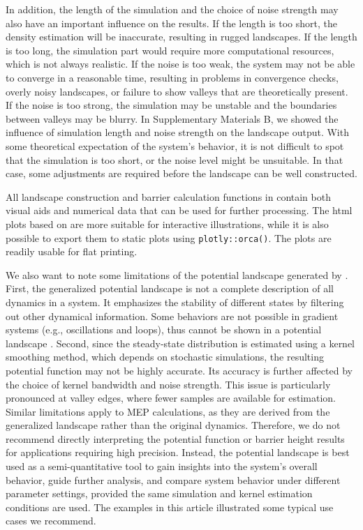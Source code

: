In addition, the length of the simulation and the choice of noise strength may also have an important influence on the results. If the length is too short, the density estimation will be inaccurate, resulting in rugged landscapes. If the length is too long, the simulation part would require more computational resources, which is not always realistic. If the noise is too weak, the system may not be able to converge in a reasonable time, resulting in problems in convergence checks, overly noisy landscapes, or failure to show valleys that are theoretically present. If the noise is too strong, the simulation may be unstable and the boundaries between valleys may be blurry. In Supplementary Materials B, we showed the influence of simulation length and noise strength on the landscape output. With some theoretical expectation of the system's behavior, it is not difficult to spot that the simulation is too short, or the noise level might be unsuitable. In that case, some adjustments are required before the landscape can be well constructed.

All landscape construction and barrier calculation functions in  contain both visual aids and numerical data that can be used for further processing. The html plots based on  are more suitable for interactive illustrations, while it is also possible to export them to static plots using \texttt{plotly::orca()}. The  plots are readily usable for flat printing.

We also want to note some limitations of the potential landscape generated by . First, the generalized potential landscape is not a complete description of all dynamics in a system. It emphasizes the stability of different states by filtering out other dynamical information. Some behaviors are not possible in gradient systems (e.g., oscillations and loops), thus cannot be shown in a potential landscape \citep{zhouConstructionLandscapeMultistable2016}. Second, since the steady-state distribution is estimated using a kernel smoothing method, which depends on stochastic simulations, the resulting potential function may not be highly accurate. Its accuracy is further affected by the choice of kernel bandwidth and noise strength. This issue is particularly pronounced at valley edges, where fewer samples are available for estimation. Similar limitations apply to MEP calculations, as they are derived from the generalized landscape rather than the original dynamics. Therefore, we do not recommend directly interpreting the potential function or barrier height results for applications requiring high precision. Instead, the potential landscape is best used as a semi-quantitative tool to gain insights into the system's overall behavior, guide further analysis, and compare system behavior under different parameter settings, provided the same simulation and kernel estimation conditions are used. The examples in this article illustrated some typical use cases we recommend.

